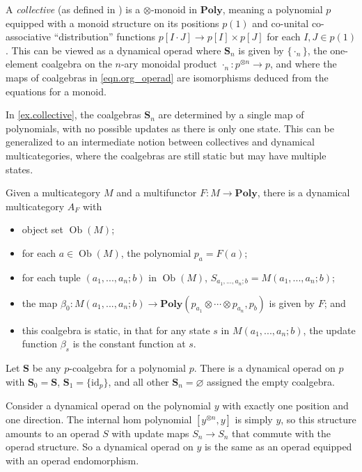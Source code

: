 \documentclass[11pt, one side, article]{memoir}
\theoremstyle{definition}
\theoremstyle{plain}
\newenvironment{example}
  {\pushQED{\qed}\renewcommand{\qedsymbol}{$\lozenge$}\examplex}
  {\popQED\endexamplex}
\DeclareMathOperator{\ob}{Ob}
\newcommand{\Cat}[1]{\mathbf{#1}}%
\newcommand{\id}{\mathrm{id}}
\newcommand{\poly}{\Cat{Poly}}
\newcommand{\0}{\textsf{0}}
\newcommand{\1}{\tn{\textsf{1}}}
\renewcommand{\S}{{\Cat{S}}}
\newcommand{\idcoalg}[1]{{\{\id_{#1}\}}}
\begin{document}
\begin{example}\label{ex.collective}
A \emph{collective} (as defined in \cite{niu2021collectives}) is a $\otimes$-monoid in $\poly$, meaning a polynomial $p$ equipped with a monoid structure on its positions $p(1)$ and co-unital co-associative ``distribution'' functions $p[I \cdot J] \to p[I] \times p[J]$ for each $I,J \in p(1)$. This can be viewed as a dynamical operad where $\S_n$ is given by $\{\cdot_n\}$, the one-element coalgebra on the $n$-ary monoidal product $\cdot_n : p^{\otimes n} \to p$, and where the maps of coalgebras in \eqref{eqn.org_operad} are isomorphisms deduced from the equations for a monoid.
\end{example}

\begin{example}
In \cref{ex.collective}, the coalgebras $\S_n$ are determined by a single map of polynomials, with no possible updates as there is only one state. This can be generalized to an intermediate notion between collectives and dynamical multicategories, where the coalgebras are still static but may have multiple states.

Given a multicategory $M$ and a multifunctor $F : M \to \poly$, there is a dynamical multicategory $A_F$ with 
\begin{itemize}
	\item object set $\ob(M)$;
	\item for each $a \in \ob(M)$, the polynomial $p_a = F(a)$;
	\item for each tuple $(a_1,...,a_n;b)$ in $\ob(M)$, $S_{a_1,...,a_n;b} = M(a_1,...,a_n;b)$;
	\item the map $\beta_0 : M(a_1,...,a_n;b) \to \poly(p_{a_1} \otimes \cdots \otimes p_{a_n},p_b)$ is given by $F$; and 
	\item this coalgebra is static, in that for any state $s$ in $M(a_1,...,a_n;b)$, the update function $\beta_s$ is the constant function at $s$.
	\qedhere
\end{itemize}
\end{example}

\begin{example}
Let $\S$ be any $p$-coalgebra for a polynomial $p$. There is a dynamical operad on $p$ with $\S_0 = \S$, $\S_1 = \idcoalg{p}$, and all other $\S_n=\varnothing$ assigned the empty coalgebra.
\end{example}

\begin{example}
Consider a dynamical operad on the polynomial $y$ with exactly one position and one direction. The internal hom polynomial $[y^{\otimes n},y]$ is simply $y$, so this structure amounts to an operad $S$ with update maps $S_n \to S_n$ that commute with the operad structure. So a dynamical operad on $y$ is the same as an operad equipped with an operad endomorphism.
\end{example}
\end{document}
